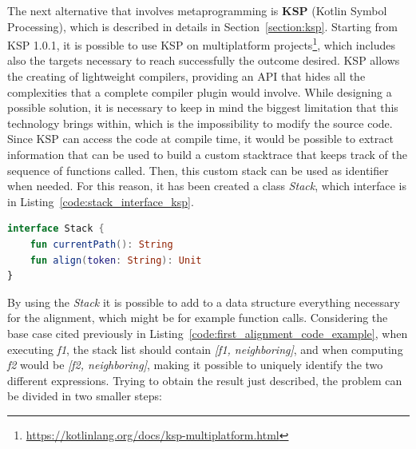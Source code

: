 The next alternative that involves metaprogramming is \textbf{KSP} (Kotlin Symbol Processing), which is described in details in Section~\ref{section:ksp}. Starting from KSP 1.0.1, it is possible to use KSP on multiplatform projects\footnote{\url{https://kotlinlang.org/docs/ksp-multiplatform.html}}, which includes also the targets necessary to reach successfully the outcome desired.\newline
KSP allows the creating of lightweight compilers, providing an API that hides all the complexities that a complete compiler plugin would involve. While designing a possible solution, it is necessary to keep in mind the biggest limitation that this technology brings within, which is the impossibility to modify the source code.\newline
Since KSP can access the code at compile time, it would be possible to extract information that can be used to build a custom stacktrace that keeps track of the sequence of functions called. Then, this custom stack can be used as identifier when needed. For this reason, it has been created a class \textit{Stack}, which interface is in Listing~\ref{code:stack_interface_ksp}.
\begin{lstlisting}[caption={Stack interface for KSP}, captionpos=b, language=Kotlin, label={code:stack_interface_ksp}]
interface Stack {
    fun currentPath(): String
    fun align(token: String): Unit
}
\end{lstlisting}
By using the \textit{Stack} it is possible to add to a data structure everything necessary for the alignment, which might be for example function calls. Considering the base case cited previously in Listing~\ref{code:first_alignment_code_example}, when executing \textit{f1}, the stack list should contain \textit{[f1, neighboring]}, and when computing \textit{f2} would be \textit{[f2, neighboring]}, making it possible to uniquely identify the two different expressions.\newline
Trying to obtain the result just described, the problem can be divided in two smaller steps:
